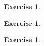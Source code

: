 \documentclass[answers]{exam}
\newtheorem{exercise}[theorem]{Exercise}
\theoremstyle{definition}
\theoremstyle{remark}
\begin{document}
\begin{exercise}
    
\end{exercise}
\begin{solution}
    
\end{solution}




\begin{exercise}
    
\end{exercise}
\begin{solution}
    
\end{solution}




\begin{exercise}
    
\end{exercise}
\begin{solution}
    
\end{solution}
\end{document}
